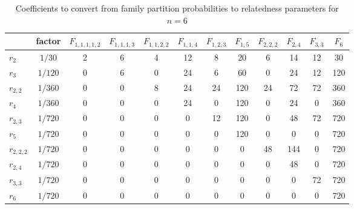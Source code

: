\begin{table}[h]
\centering
\caption{Coefficients to convert from family partition probabilities to relatedness parameters for $n=6$}
\begin{tabular}{lccccccccccc}
\toprule
            &  factor &  $F_{1,1,1,1,2}$ &  $F_{1,1,1,3}$ &  $F_{1,1,2,2}$ &  $F_{1,1,4}$ &  $F_{1,2,3}$ &  $F_{1,5}$ &  $F_{2,2,2}$ &  $F_{2,4}$ &  $F_{3,3}$ &  $F_{6}$ \\
\midrule
    $r_{2}$ &  $1/30$ &                2 &              6 &              4 &           12 &            8 &         20 &            6 &         14 &         12 &       30 \\
    $r_{3}$ & $1/120$ &                0 &              6 &              0 &           24 &            6 &         60 &            0 &         24 &         12 &      120 \\
  $r_{2,2}$ & $1/360$ &                0 &              0 &              8 &           24 &           24 &        120 &           24 &         72 &         72 &      360 \\
    $r_{4}$ & $1/360$ &                0 &              0 &              0 &           24 &            0 &        120 &            0 &         24 &          0 &      360 \\
  $r_{2,3}$ & $1/720$ &                0 &              0 &              0 &            0 &           12 &        120 &            0 &         48 &         72 &      720 \\
    $r_{5}$ & $1/720$ &                0 &              0 &              0 &            0 &            0 &        120 &            0 &          0 &          0 &      720 \\
$r_{2,2,2}$ & $1/720$ &                0 &              0 &              0 &            0 &            0 &          0 &           48 &        144 &          0 &      720 \\
  $r_{2,4}$ & $1/720$ &                0 &              0 &              0 &            0 &            0 &          0 &            0 &         48 &          0 &      720 \\
  $r_{3,3}$ & $1/720$ &                0 &              0 &              0 &            0 &            0 &          0 &            0 &          0 &         72 &      720 \\
    $r_{6}$ & $1/720$ &                0 &              0 &              0 &            0 &            0 &          0 &            0 &          0 &          0 &      720 \\
\bottomrule
\end{tabular}
\end{table}

